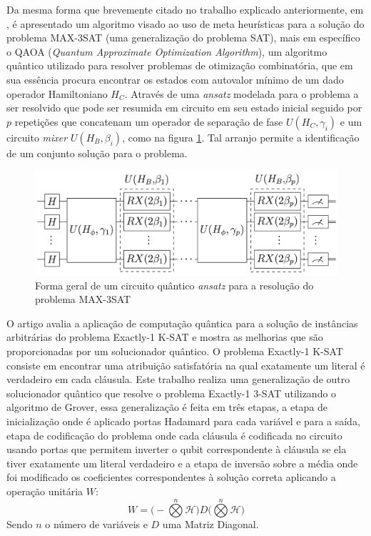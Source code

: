 \documentclass[12pt]{article}
\begin{document}

Da mesma forma que brevemente citado no trabalho explicado anteriormente, em \textbf{\cite{mandl:24}}, é apresentado um algoritmo visado ao uso de meta heurísticas para a solução do problema MAX-3SAT (uma generalização do problema SAT), mais em específico o QAOA (\textit{Quantum Approximate Optimization Algorithm}), um algoritmo quântico utilizado para resolver problemas de otimização combinatória, que em sua essência procura encontrar os estados com autovalor mínimo de um dado operador Hamiltoniano $H_C$. Através de uma \textit{ansatz} modelada para o problema a ser resolvido que pode ser resumida em circuito em seu estado inicial seguido por $p$ repetições que concatenam um operador de separação de fase $U(H_C,\gamma_i)$ e um circuito \textit{mixer} $U(H_B, \beta_i)$, como na figura \ref{fig:quantum_ansatz_circuit}. Tal arranjo permite a identificação de um conjunto solução para o problema.
\begin{figure}[h]
    \centering
    \includegraphics[width=0.5\linewidth]{quantum_ansatz_circuit.jpg}
    \caption{Forma geral de um circuito quântico \textit{ansatz} para a resolução do problema MAX-3SAT \textbf{\cite{mandl:24}}}
    \label{fig:quantum_ansatz_circuit}
\end{figure}


O artigo \textbf{\cite{piro:20}} avalia a aplicação de computação quântica para a solução de instâncias arbitrárias do problema Exactly-1 K-SAT e mostra as melhorias que são proporcionadas por um solucionador quântico. O problema Exactly-1 K-SAT consiste em encontrar uma atribuição satisfatória na qual exatamente um literal é verdadeiro em cada cláusula. Este trabalho realiza uma generalização de outro solucionador quântico que resolve o problema Exactly-1 3-SAT utilizando o algoritmo de Grover, essa generalização é feita em três etapas, a etapa de inicialização onde é aplicado portas Hadamard para cada variável e para a saída, etapa de codificação do problema onde cada cláusula é codificada no circuito usando portas que permitem inverter o qubit correspondente à cláusula se ela tiver exatamente um literal verdadeiro e a etapa de inversão sobre a média onde foi modificado os coeficientes correspondentes à solução correta aplicando a operação unitária \(W\):
\[
W = \big( - \overset{n}{\bigotimes} \mathcal{H} \big) D \big( \overset{n}{\bigotimes} \mathcal{H} \big)
\]
Sendo \(n\) o número de variáveis e \(D\) uma Matriz Diagonal.
\end{document}
